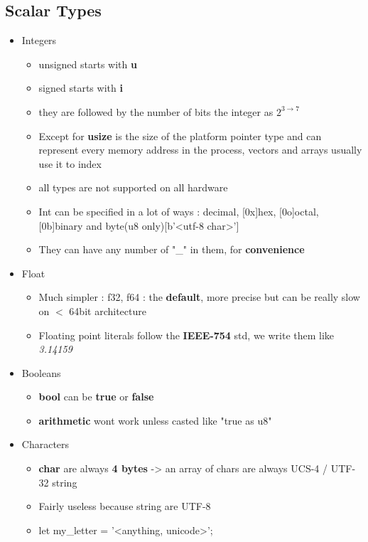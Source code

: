 \documentclass{report}
\newcommand{\warning}{
	{\fontencoding{U}\fontfamily{futs}\selectfont\char 66\relax}
}
\begin{document}
\begin{multicols*}{2}

\section{Scalar Types}

\begin{itemize}
  \item Integers
    \begin{itemize}
      \item unsigned starts with \textbf{u} 
      \item signed starts with \textbf{i} 
      \item they are followed by the number of bits the integer as $2^{3 \rightarrow 7}$ 
      \item Except for \textbf{usize} is the size of the platform pointer type and can represent
        every memory address in the process, vectors and arrays usually use it to index 
      \item \warning all types are not supported on all hardware 
      \item Int can be specified in a lot of ways : decimal, [0x]hex, [0o]octal, [0b]binary and byte(u8 only)[b'<utf-8 char>']
      \item They can have any number of "\_" in them, for \textbf{convenience} 
    \end{itemize}
  \item Float 
    \begin{itemize}
      \item Much simpler : f32, f64 : the \textbf{default}, more precise but can be really slow on $<$ 64bit architecture 
      \item Floating point literals follow the \textbf{IEEE-754} std, we write them like \textit{3.14159} 
    \end{itemize}
  \item Booleans 
    \begin{itemize}
      \item \textbf{bool} can be \textbf{true} or \textbf{false} 
      \item \textbf{arithmetic} wont work unless casted like "true as u8"
    \end{itemize}
  \item Characters
    \begin{itemize}
      \item \textbf{char} are always \textbf{4 bytes} -> an array of chars are always UCS-4 / UTF-32 string 
      \item Fairly useless because string are UTF-8 
      \item let my\_letter = '<anything, unicode>';
    \end{itemize}
\end{itemize}


\end{multicols*}
\end{document}
